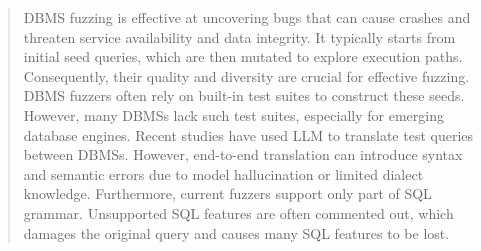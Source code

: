 \documentclass[sigconf,review,anonymous]{acmart}
\begin{document}
\begin{abstract}
DBMS fuzzing is effective at uncovering bugs that can cause crashes and threaten service availability and data integrity. 
It typically starts from initial seed queries, which are then mutated to explore execution paths.
Consequently, their quality and diversity are crucial for effective fuzzing.
DBMS fuzzers often rely on built-in test suites to construct these seeds.
However, many DBMSs lack such test suites, especially for emerging database engines. 
Recent studies have used LLM to translate test queries between DBMSs. However, end-to-end translation can introduce syntax and semantic errors due to model hallucination or limited dialect knowledge.
Furthermore, current fuzzers support only part of SQL grammar. 
Unsupported SQL features are often commented out, which damages the original query and causes many SQL features to be lost.



\end{abstract}
\end{document}
